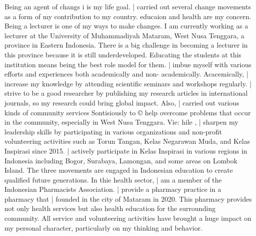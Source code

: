 \documentclass[../main.tex]{subfiles}
\begin{document}
Being an agent of changs i is my life goal. | carried out several change movements as a form of my contribution to my
country. educaion and health are my concern. Being a lecturer is one of my ways to make changes. I am
currently working as a lecturer at the University of Muhammadiyah Mataram, West Nusa Tenggara, a province in
Eastern Indonesia. There is a big challenge in becoming a lecturer in this province because it is still underdeveloped.
Educating the students at this institution means being the best role model for them. | imbue myself with various efforts
and experiences both academically and non- academically. Acacemically, | increase my knowledge by attending
scientific seminars and workshops regularly. | strive to be a good researcher by publishing my research articles in
international journals, so my research could bring global impact. Also, | carried out various kinds of community services
Sontisiously to © help overcome problems that occur in the community, especially in West Nusa Tenggara. Vie: hile
, | sharpen my leadership skills by participating in various organizations and non-profit volunteering
activities such as Torun Tangan, Kelas Negarawan Muda, and Kelas Inspirasi since 2015. | actively participate in Kelas
Inspirasi in various regions in Indonesia including Bogor, Surabaya, Lamongan, and some areas on Lombok Island. The
three movements are engaged in Indonesian education to create qualified future generations. In thie health sector, | am
a member of the Indonesian Pharmacists Association. | provide a pharmacy practice in a pharmacy that | founded in
the city of Mataram in 2020. This pharmacy provides not only health services but also health education for the
surrounding community. All service and volunteering activities have brought a huge impact on my personal character,
particularly on my thinking and behavior.



\end{document}
